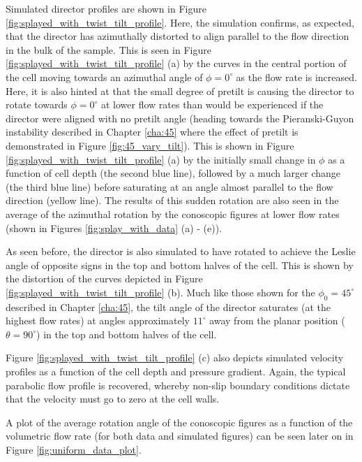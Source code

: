 Simulated director profiles are shown in Figure \ref{fig:splayed_with_twist_tilt_profile}. Here, the simulation confirms, as expected, that the director has azimuthally distorted to align parallel to the flow direction in the bulk of the sample. This is seen in Figure \ref{fig:splayed_with_twist_tilt_profile} (a) by the curves in the central portion of the cell moving towards an azimuthal angle of $\phi=0^{\circ}$ as the flow rate is increased. Here, it is also hinted at that the small degree of pretilt is causing the director to rotate towards $\phi=0^{\circ}$ at lower flow rates than would be experienced if the director were aligned with no pretilt angle (heading towards the Pieranski-Guyon instability described in Chapter \ref{cha:45} where the effect of pretilt is demonstrated in Figure \ref{fig:45_vary_tilt}). This is shown in Figure \ref{fig:splayed_with_twist_tilt_profile} (a) by the initially small change in $\phi$ as a function of cell depth (the second blue line), followed by a much larger change (the third blue line) before saturating at an angle almost parallel to the flow direction (yellow line). The results of this sudden rotation are also seen in the average of the azimuthal rotation by the conoscopic figures at lower flow rates (shown in Figures \ref{fig:splay_with_data} (a) - (e)).

As seen before, the director is also simulated to have rotated to achieve the Leslie angle of opposite signs in the top and bottom halves of the cell. This is shown by the distortion of the curves depicted in Figure \ref{fig:splayed_with_twist_tilt_profile} (b). Much like those shown for the $\phi_0=45^{\circ}$ described in Chapter \ref{cha:45}, the tilt angle of the director saturates (at the highest flow rates) at angles approximately $11^{\circ}$ away from the planar position ($\theta=90^{\circ}$) in the top and bottom halves of the cell.

Figure \ref{fig:splayed_with_twist_tilt_profile} (c) also depicts simulated velocity profiles as a function of the cell depth and pressure gradient. Again, the typical parabolic flow profile is recovered, whereby non-slip boundary conditions dictate that the velocity must go to zero at the cell walls.

A plot of the average rotation angle of the conoscopic figures as a function of the volumetric flow rate (for both data and simulated figures) can be seen later on in Figure \ref{fig:uniform_data_plot}.

